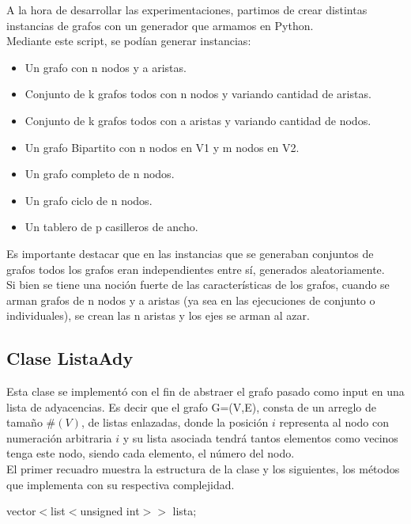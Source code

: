 \documentclass[a4paper]{article}
\begin{document}
A la hora de desarrollar las experimentaciones, partimos de crear distintas instancias de grafos con un generador que armamos en Python.\\

Mediante este script, se podían generar instancias:

\begin{itemize}
\item Un grafo con n nodos y a aristas.
\item Conjunto de k grafos todos con n nodos y variando cantidad de aristas.
\item Conjunto de k grafos todos con a aristas y variando cantidad de nodos.
\item Un grafo Bipartito con n nodos en V1 y m nodos en V2.
\item Un grafo completo de n nodos.
\item Un grafo ciclo de n nodos.
\item Un tablero de p casilleros de ancho.
\end{itemize}

Es importante destacar que en las instancias que se generaban conjuntos de grafos todos los grafos eran independientes entre sí, generados aleatoriamente.\\

Si bien se tiene una noción fuerte de las características de los grafos, cuando se arman grafos de n nodos y a aristas (ya sea en las ejecuciones de conjunto o individuales), se crean las n aristas y los ejes se arman al azar.

\subsection{Clase ListaAdy} \label{listaAdy}

Esta clase se implement\'o con el fin de abstraer el grafo pasado como input en una lista de adyacencias. Es decir que el grafo G=(V,E), consta de un arreglo de tama\~no $\#(V)$, de listas enlazadas, donde la posici\'on $i$ representa al nodo con numeraci\'on arbitraria $i$ y su lista asociada tendr\'a tantos elementos como vecinos tenga este nodo, siendo cada elemento, el n\'umero del nodo.\\

El primer recuadro muestra la estructura de la clase y los siguientes, los m\'etodos que implementa con su respectiva complejidad.

\begin{algorithm}[h!]
	vector$<$list$<$unsigned int$> >$ lista;
\end{algorithm}
\end{document}
